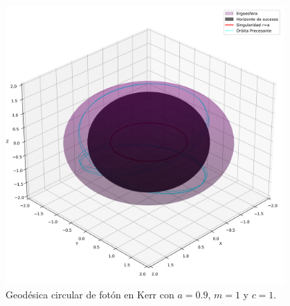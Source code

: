 \begin{figure}[H]
    \begin{small}
        \begin{center}
            \includegraphics[width=0.95\textwidth]{AgujerosNegros/kerr/geodesics_plots/geodesica_circular_foton_r1,7179.png}
        \end{center}
        \caption{Geodésica circular de fotón en Kerr con $a = 0.9$, $m=1$ y $c=1$.}
        \label{fig:geodesica_circular_foton_r1,7179}
    \end{small}
\end{figure}
